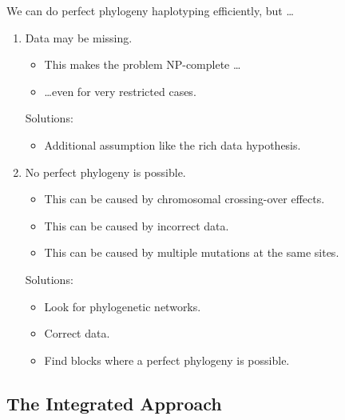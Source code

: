 \documentclass{beamer}
\begin{document}
\begin{frame}{We can do perfect phylogeny haplotyping efficiently, but
    \dots}
  \begin{enumerate}
  \item \alert{Data may be missing.}
    \begin{itemize}
    \item This makes the problem NP-complete \dots
    \item \dots even for very restricted cases.
    \end{itemize}
    \textcolor{green!50!black}{Solutions:}
    \begin{itemize}
    \item Additional assumption like the rich data hypothesis. 
    \end{itemize}
  \item \alert{No perfect phylogeny is possible.}
    \begin{itemize}
    \item This can be caused by chromosomal crossing-over effects.
    \item This can be caused by incorrect data.
    \item This can be caused by multiple mutations at the same sites.
    \end{itemize}
    \textcolor{green!50!black}{Solutions:}
    \begin{itemize}
    \item Look for phylogenetic networks.
    \item Correct data.
    \item<alert@1->
       Find blocks where a perfect phylogeny is possible.
    \end{itemize}
  \end{enumerate}
\end{frame}


\subsection{The Integrated Approach}
\end{document}
